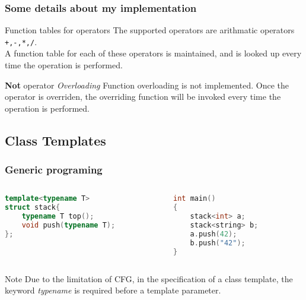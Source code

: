 \documentclass{beamer}
\begin{document}
\begin{frame}
    \frametitle{Some details about my implementation}

    \begin{block}{Function tables for operators}
        The supported operators are arithmatic operators \lstinline{+,-,*,/}. \\
        A function table for each of these operators is maintained, and is looked up every time the operation is performed.
    \end{block}

    \begin{block}{\textbf{Not} operator \textit{Overloading}}
        Function overloading is not implemented. Once the operator is overriden, the overriding function will be invoked every time the operation is performed.
    \end{block}

\end{frame}
\subsection{Class Templates}

\begin{frame}[fragile]
    \frametitle{Generic programing}

    \begin{example}
        \footnotesize
        \begin{columns}
            \begin{column}[]{0.4\textwidth}
                \begin{lstlisting}[language=C++]
template<typename T>
struct stack{
    typename T top();
    void push(typename T);
};
                \end{lstlisting}

            \end{column}

            \begin{column}[]{0.4\textwidth}
                \begin{lstlisting}[language=C]
int main()
{
    stack<int> a;
    stack<string> b;
    a.push(42);
    b.push("42");
}
                \end{lstlisting}
            \end{column}
        \end{columns}
    \end{example}

    \begin{block}{Note}
        \small
        Due to the limitation of CFG, in the specification of a class template, the keyword \textit{typename} is required before a template parameter.
    \end{block}
\end{frame}
\end{document}
